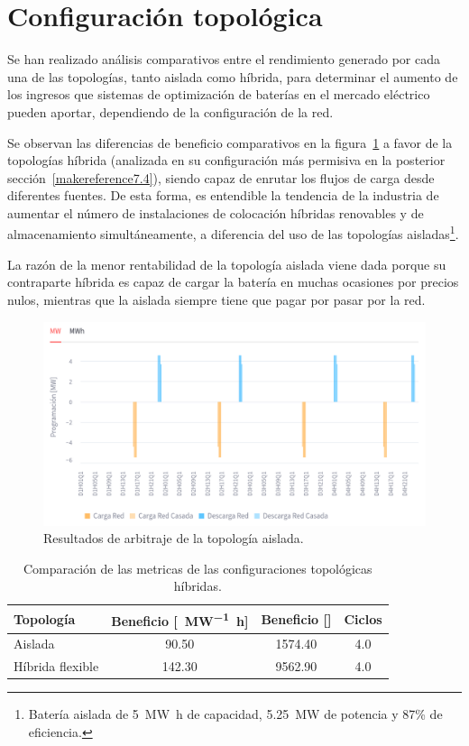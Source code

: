 \section{Configuración topológica}
\label{makereference7.3}

Se han realizado análisis comparativos entre el rendimiento generado por cada una de las topologías, tanto aislada como híbrida, para determinar el aumento de los ingresos que sistemas de optimización de baterías en el mercado eléctrico pueden aportar, dependiendo de la configuración de la red.

Se observan las diferencias de beneficio comparativos en la figura~\ref{fig:posicion-aislada} a favor de la topologías híbrida (analizada en su configuración más permisiva en la posterior sección~\ref{makereference7.4}), siendo capaz de enrutar los flujos de carga desde diferentes fuentes. De esta forma, es entendible la tendencia de la industria de aumentar el número de instalaciones de colocación híbridas renovables y de almacenamiento simultáneamente, a diferencia del uso de las topologías aisladas\footnote{Batería aislada de \SI{5}{{\mega\watt\hour}} de capacidad, \SI{5.25}{{\mega\watt}} de potencia y 87\% de eficiencia.}.

La razón de la menor rentabilidad de la topología aislada viene dada porque su contraparte híbrida es capaz de cargar la batería en muchas ocasiones por precios nulos, mientras que la aislada siempre tiene que pagar por pasar por la red.

\begin{figure}
  \centering
  \includegraphics[width=0.5\linewidth]{figures/posicion-aislada.png}
  \caption[Resultados de arbitraje de la topología aislada.]{Resultados de arbitraje de la topología aislada.}
  \label{fig:posicion-aislada}
\end{figure}

\begin{table}[ht]
  \centering
  \begin{tabular}{|l|S|S|S|}
    \hline
    Topología        & {Beneficio [\si{\text{\euro}\per\mega\watt\hour}]} & {Beneficio [\si{\text{\euro}}]} & Ciclos \\
    \hline
    Aislada          &  90.50                                             & 1574.40                         & 4.0    \\
    Híbrida flexible & 142.30                                             & 9562.90                         & 4.0    \\
    \hline
  \end{tabular}
  \caption[Comparación de configuraciones topológicas híbridas.]{Comparación de las metricas de las configuraciones topológicas híbridas.}
  \label{tab:comparacion-hibridacion}
\end{table}

